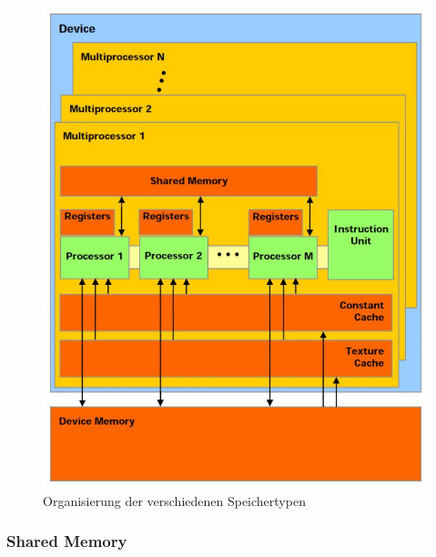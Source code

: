 \begin{figure}
	\centering
	\includegraphics[scale=0.4]{images/cuda_mem.png}
	\caption{Organisierung der verschiedenen Speichertypen \cite{cud2012}}
	\label{img:cuda_mem}
\end{figure}

\subsubsection{Shared Memory}

